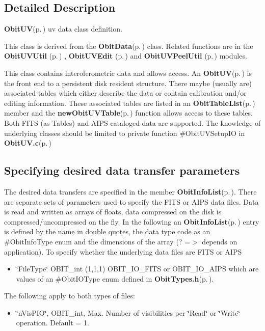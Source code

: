 \subsection{Detailed Description}
{\bf Obit\-UV}{\rm (p.\,\pageref{structObitUV})} uv data class definition. 

This class is derived from the {\bf Obit\-Data}{\rm (p.\,\pageref{structObitData})} class. Related functions are in the {\bf Obit\-UVUtil }{\rm (p.\,\pageref{ObitUVUtil_8h})} , {\bf Obit\-UVEdit }{\rm (p.\,\pageref{ObitUVEdit_8h})} and {\bf Obit\-UVPeel\-Util }{\rm (p.\,\pageref{ObitUVPeelUtil_8h})} modules.

This class contains interoferometric data and allows access. An {\bf Obit\-UV}{\rm (p.\,\pageref{structObitUV})} is the front end to a persistent disk resident structure. There maybe (usually are) associated tables which either describe the data or contain calibration and/or editing information. These associated tables are listed in an {\bf Obit\-Table\-List}{\rm (p.\,\pageref{structObitTableList})} member and the {\bf new\-Obit\-UVTable}{\rm (p.\,\pageref{ObitUV_8c_a30})} function allows access to these tables. Both FITS (as Tables) and AIPS cataloged data are supported. The knowledge of underlying classes should be limited to private function \#Obit\-UVSetup\-IO in {\bf Obit\-UV.c}{\rm (p.\,\pageref{ObitUV_8c})}\subsection{Specifying desired data transfer parameters}\label{ObitUV_8h_ObitUVSpecification}
The desired data transfers are specified in the member {\bf Obit\-Info\-List}{\rm (p.\,\pageref{structObitInfoList})}. There are separate sets of parameters used to specify the FITS or AIPS data files. Data is read and written as arrays of floats, data compressed on the disk is compressed/uncompressed on the fly. In the following an {\bf Obit\-Info\-List}{\rm (p.\,\pageref{structObitInfoList})} entry is defined by the name in double quotes, the data type code as an \#Obit\-Info\-Type enum and the dimensions of the array (? =$>$ depends on application). To specify whether the underlying data files are FITS or AIPS \begin{itemize}
\item \char`\"{}File\-Type\char`\"{} OBIT\_\-int (1,1,1) OBIT\_\-IO\_\-FITS or OBIT\_\-IO\_\-AIPS which are values of an \#Obit\-IOType enum defined in {\bf Obit\-Types.h}{\rm (p.\,\pageref{ObitTypes_8h})}.\end{itemize}
The following apply to both types of files: \begin{itemize}
\item \char`\"{}n\-Vis\-PIO\char`\"{}, OBIT\_\-int, Max. Number of visibilities per \char`\"{}Read\char`\"{} or \char`\"{}Write\char`\"{} operation. Default = 1.\end{itemize}
